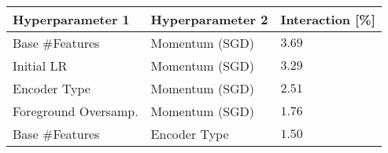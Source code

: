 \begin{tabular}{lll}
\toprule
Hyperparameter 1 & Hyperparameter 2 & Interaction [\%] \\
\midrule
Base #Features & Momentum (SGD) & $3.69$ \\
Initial LR & Momentum (SGD) & $3.29$ \\
Encoder Type & Momentum (SGD) & $2.51$ \\
Foreground Oversamp. & Momentum (SGD) & $1.76$ \\
Base #Features & Encoder Type & $1.50$ \\
\bottomrule
\end{tabular}
